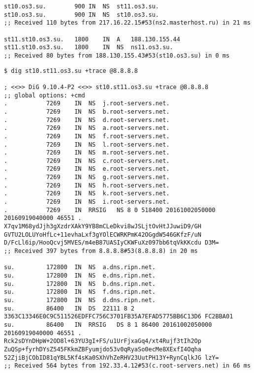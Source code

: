 \documentclass[a4paper,11pt]{article}
\begin{document}
\begin{lstlisting}[caption="Checking zone st11.st10.os3.su"]
st10.os3.su.        900 IN  NS  st11.os3.su.
st10.os3.su.        900 IN  NS  st10.os3.su.
;; Received 110 bytes from 217.16.22.15#53(ns2.masterhost.ru) in 21 ms

st11.st10.os3.su.   1800    IN  A   188.130.155.44
st11.st10.os3.su.   1800    IN  NS  ns11.os3.su.
;; Received 80 bytes from 188.130.155.43#53(st10.os3.su) in 0 ms
\end{lstlisting}

\begin{lstlisting}[caption="Checking zone st10.st11.os3.su"]
$ dig st10.st11.os3.su +trace @8.8.8.8

; <<>> DiG 9.10.4-P2 <<>> st10.st11.os3.su +trace @8.8.8.8
;; global options: +cmd
.           7269    IN  NS  j.root-servers.net.
.           7269    IN  NS  b.root-servers.net.
.           7269    IN  NS  d.root-servers.net.
.           7269    IN  NS  a.root-servers.net.
.           7269    IN  NS  f.root-servers.net.
.           7269    IN  NS  l.root-servers.net.
.           7269    IN  NS  m.root-servers.net.
.           7269    IN  NS  c.root-servers.net.
.           7269    IN  NS  e.root-servers.net.
.           7269    IN  NS  g.root-servers.net.
.           7269    IN  NS  h.root-servers.net.
.           7269    IN  NS  k.root-servers.net.
.           7269    IN  NS  i.root-servers.net.
.           7269    IN  RRSIG   NS 8 0 518400 20161002050000 20160919040000 46551 . X7qv1M68ydJjh3gXzdrXAkY9YB8mCLeDkvi8wJSLjtOvHtJJuwiD9/GH GVTU2LOLUYoHfLc+11evhaLxf3gYOlECWRKPmK42OGgdW546GKfzF/uN D/FcLl6ip/HooQcvj5MVES/m4eB87UASIyCKWFuXz097bb6tqVkKKcdu D3M=
;; Received 397 bytes from 8.8.8.8#53(8.8.8.8) in 20 ms

su.         172800  IN  NS  a.dns.ripn.net.
su.         172800  IN  NS  e.dns.ripn.net.
su.         172800  IN  NS  b.dns.ripn.net.
su.         172800  IN  NS  f.dns.ripn.net.
su.         172800  IN  NS  d.dns.ripn.net.
su.         86400   IN  DS  22111 8 2 3363C13346E0C9C511526EDFFC756C3701FB35A7EFAD5775BB6C13D6 FC2BBA01
su.         86400   IN  RRSIG   DS 8 1 86400 20161002050000 20160919040000 46551 . Rck2sDYnDHpW+2OD8l+63YU3gI+FS/u1UrFjxaGq4/xt4Rujf3tIh2Op ZuQSp+fyrhDYsZ545FKkmZBFyumjdo53v0qRyaSo0ecMe8XExfI4Oqha 52ZjiBjCObID81qYBL5Kf4sKa0SXhVhZeRHV23UutPH13Y+RynCqlkJG lzY=
;; Received 564 bytes from 192.33.4.12#53(c.root-servers.net) in 66 ms


\end{lstlisting}
\end{document}
